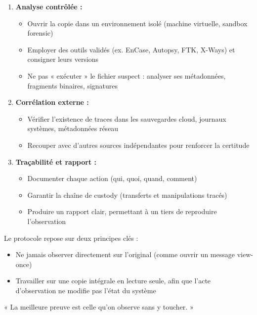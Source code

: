 \documentclass[12pt]{article}
\begin{document}
\begin{enumerate}
\item \textbf{Analyse contrôlée :}
  \begin{itemize}
  \item Ouvrir la copie dans un environnement isolé (machine virtuelle, sandbox forensic)
  \item Employer des outils validés (ex. EnCase, Autopsy, FTK, X-Ways) et consigner leurs versions
  \item Ne pas « exécuter » le fichier suspect : analyser ses métadonnées, fragments binaires, signatures
  \end{itemize}

\item \textbf{Corrélation externe :}
  \begin{itemize}
  \item Vérifier l'existence de traces dans les sauvegardes cloud, journaux systèmes, métadonnées réseau
  \item Recouper avec d'autres sources indépendantes pour renforcer la certitude
  \end{itemize}

\item \textbf{Traçabilité et rapport :}
  \begin{itemize}
  \item Documenter chaque action (qui, quoi, quand, comment)
  \item Garantir la chaîne de custody (transferts et manipulations tracés)
  \item Produire un rapport clair, permettant à un tiers de reproduire l'observation
  \end{itemize}
\end{enumerate}

Le protocole repose sur deux principes clés :
\begin{itemize}
\item Ne jamais observer directement sur l'original (comme ouvrir un message view-once)
\item Travailler sur une copie intégrale en lecture seule, afin que l'acte d'observation ne modifie pas l'état du système
\end{itemize}

« La meilleure preuve est celle qu'on observe sans y toucher. »
\end{document}
